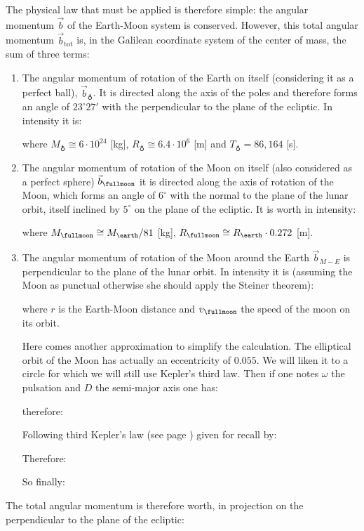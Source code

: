 	The physical law that must be applied is therefore simple: the angular momentum $\vec{b}$ of the Earth-Moon system is conserved. However, this total angular momentum $\vec{b}_{\text{tot}}$ is, in the Galilean coordinate system of the center of mass, the sum of three terms:
	\begin{enumerate}
		\item The angular momentum of rotation of the Earth on itself (considering it as a perfect ball), $\vec{b}_{\earth}$. It is directed along the axis of the poles and therefore forms an angle of $23^\circ 27'$ with the perpendicular to the plane of the ecliptic. In intensity it is:
		
		where $M_{\earth}\cong 6\cdot 10^{24}$ [kg], $R_{\earth}\cong 6.4\cdot 10^{6}$ [m] and $T_{\earth}=86,164$ [s].
	
		\item The angular momentum of rotation of the Moon on itself (also considered as a perfect sphere) $\vec{b}_{\fullmoon}$ it is directed along the axis of rotation of the Moon, which forms an angle of $6^\circ$ with the normal to the plane of the lunar orbit, itself inclined by $5^\circ$ on the plane of the ecliptic. It is worth in intensity:
		
		where $M_{\fullmoon}\cong M_{\earth}/81$ [kg], $R_{\fullmoon}\cong R_{\earth}\cdot 0.272$ [m].
	
		\item The angular momentum of rotation of the Moon around the Earth $\vec{b}_{M-E}$ is perpendicular to the plane of the lunar orbit. In intensity it is (assuming the Moon as punctual otherwise she should apply the Steiner theorem):
		
		where $r$ is the Earth-Moon distance and $v_{\fullmoon}$ the speed of the moon on its orbit.
		
		Here comes another approximation to simplify the calculation. The elliptical orbit of the Moon has actually an eccentricity of $0.055$. We will liken it to a circle for which we will still use Kepler's third law. Then if one notes $\omega$ the pulsation and $D$ the semi-major axis one has:
		
		therefore:
		
		Following third Kepler's law (see page \pageref{third kepler law}) given for recall by:
		
		Therefore:
		
		So finally:
		
	\end{enumerate}
	The total angular momentum is therefore worth, in projection on the perpendicular to the plane of the ecliptic:
	
